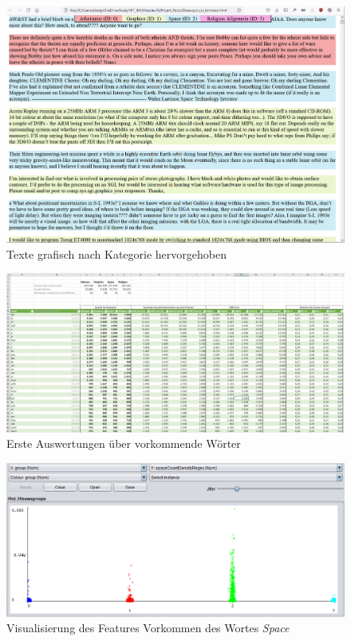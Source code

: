 \documentclass[
	11pt,
	a4paper
]{scrartcl}
\begin{document}
\begin{figure}[H]
	\includegraphics[width=\textwidth]{figures/texte_grafisch_getrennt.png}
	\caption{Texte grafisch nach Kategorie hervorgehoben}
	\label{fig:texte_grafisch_getrennt}
\end{figure}

\begin{figure}[H]
	\includegraphics[width=\textwidth]{figures/wort_auswertung_excel.png}
	\caption{Erste Auswertungen über vorkommende Wörter}
	\label{fig:wort_auswertung_excel}
\end{figure}

\begin{figure}[H]
	\includegraphics[width=\textwidth]{figures/weka_visualize_space.png}
	\caption{Visualisierung des Features Vorkommen des Wortes \emph{Space}}
	\label{fig:weka_visualize_space}
\end{figure}
\end{document}
